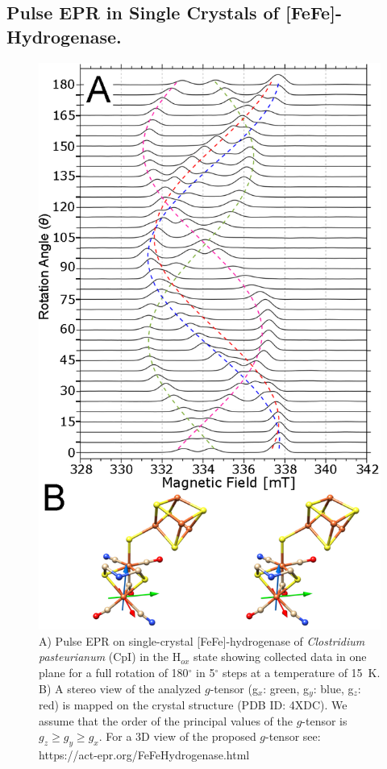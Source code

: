 \subsection{Pulse EPR in Single Crystals of [FeFe]-Hydrogenase.}
\begin{figure}[htbp]
\centering
 \includegraphics{Kapitel/Ch5-Images/04-FeFe-xTal-DataBig.eps}
 \caption[Pulse EPR on single-crystal of the H-cluster in FeFe-hydrogenase.]{A) Pulse EPR on single-crystal [FeFe]-hydrogenase of {\em Clostridium pasteurianum} (CpI) in the H$_{ox}$ state showing collected data in one plane for a full rotation of 180$^{\circ}$ in 5$^{\circ}$ steps at a temperature of 15~K. B) A stereo view of the analyzed $g$-tensor (g$_x$: green, g$_y$: blue, g$_z$: red) is mapped on the crystal structure (PDB ID: 4XDC). We assume that the order of the principal values of the $g$-tensor is $g_z\geq g_y\geq g_x$. For a 3D view of the proposed $g$-tensor see: https://act-epr.org/FeFeHydrogenase.html} 
 \label{fig:xTalFeFe}
\end{figure}

